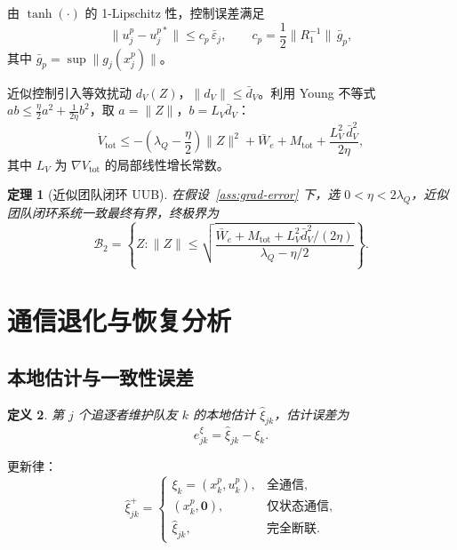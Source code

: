 \documentclass[12pt,a4paper]{ctexart}
\newtheorem{theorem}{定理}[section]
\newtheorem{definition}[theorem]{定义}
\begin{document}
由 $\tanh(\cdot)$ 的 1-Lipschitz 性，控制误差满足
\begin{equation}
\|u_j^p - u_j^{p*}\| \le c_p\,\bar{\varepsilon}_j, \qquad c_p = \frac{1}{2}\|R_1^{-1}\|\,\bar{g}_p,
\end{equation}
其中 $\bar{g}_p = \sup\|g_j(x_j^p)\|$。

近似控制引入等效扰动 $d_V(Z)$，$\|d_V\| \le \bar{d}_V$。利用 Young 不等式 $ab \le \frac{\eta}{2}a^2 + \frac{1}{2\eta}b^2$，取 $a = \|Z\|$，$b = L_V\bar{d}_V$：
\begin{equation}\label{eq:V-dot-approx}
\dot{V}_{\mathrm{tot}}
\le -\left(\lambda_Q - \frac{\eta}{2}\right)\|Z\|^2 + \bar{W}_e + M_{\mathrm{tot}} + \frac{L_V^2\,\bar{d}_V^2}{2\eta},
\end{equation}
其中 $L_V$ 为 $\nabla V_{\mathrm{tot}}$ 的局部线性增长常数。

\begin{theorem}[近似团队闭环 UUB]\label{thm:approx-uub}
在假设~\ref{ass:grad-error} 下，选 $0 < \eta < 2\lambda_Q$，近似团队闭环系统一致最终有界，终极界为
\[
\mathcal{B}_2 = \left\{Z : \|Z\| \le \sqrt{\frac{\bar{W}_e + M_{\mathrm{tot}} + L_V^2\bar{d}_V^2/(2\eta)}{\lambda_Q - \eta/2}}\right\}.
\]
\end{theorem}


\section{通信退化与恢复分析}

\subsection{本地估计与一致性误差}

\begin{definition}
第 $j$ 个追逐者维护队友 $k$ 的本地估计 $\hat{\xi}_{jk}$，估计误差为
\[
e_{jk}^\xi = \hat{\xi}_{jk} - \xi_k.
\]
\end{definition}

更新律：
\begin{equation}\label{eq:estimate-update}
\hat{\xi}_{jk}^+ =
\begin{cases}
\xi_k = (x_k^p, u_k^p), & \text{全通信}, \\
(x_k^p, \bm{0}), & \text{仅状态通信}, \\
\hat{\xi}_{jk}, & \text{完全断联}.
\end{cases}
\end{equation}
\end{document}
